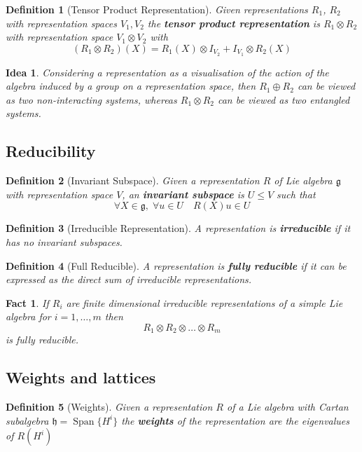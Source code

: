 \documentclass{article}
\newtheorem{definition}{Definition}[subsection]
\newtheorem{fact}{Fact}[subsection]
\newtheorem*{idea}{Idea}
\DeclareMathOperator{\spn}{Span}
\newcommand{\bam}[1]{\textbf{#1}}
\newcommand{\mf}[1]{\mathfrak{#1}}
\begin{document}
\begin{definition}[Tensor Product Representation]
Given representations $R_1$, $R_2$ with representation spaces $V_1, V_2$ the \bam{tensor product representation} is $R_1 \otimes R_2$ with representation space $V_1 \otimes V_2$ with
\[
(R_1 \otimes R_2)(X)=R_1(X)\otimes I_{V_2}+I_{V_1}\otimes R_2(X)
\]
\end{definition}

\begin{idea}
Considering a representation as a visualisation of the action of the algebra induced by a  group on a representation space, then $R_1 \oplus R_2$ can be viewed as two non-interacting systems, whereas $R_1 \otimes R_2$ can be viewed as two entangled systems.
\end{idea}

\subsection{Reducibility}
\begin{definition}[Invariant Subspace]
Given a representation $R$ of Lie algebra $\mf{g}$ with representation space $V$, an \bam{invariant subspace} is $U\leq V$ such that
\[
\forall X\in\mf{g}, \; \forall u\in U \quad R\left(X\right)u\in U
\]
\end{definition}

\begin{definition}[Irreducible Representation]
A representation is \bam{irreducible} if it has no invariant subspaces. 
\end{definition}

\begin{definition}[Full Reducible]
A representation is \bam{fully reducible} if it can be expressed as the direct sum of irreducible representations. 
\end{definition}

\begin{fact}
If $R_i$ are finite dimensional irreducible representations of a simple Lie algebra for $i=1,\dots,m$ then
\[
R_1 \otimes R_2 \otimes \dots \otimes R_m
\]
is fully reducible. 
\end{fact}

\subsection{Weights and lattices}
\begin{definition}[Weights]
Given a representation $R$ of a Lie algebra with Cartan subalgebra $\mf{h}=\spn\lbrace H^i \rbrace$ the \bam{weights} of the representation are the eigenvalues of $R(H^i)$
\end{definition}
\end{document}
